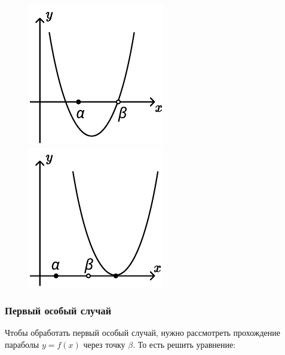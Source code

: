 \begin {figure}[h]
    \begin {minipage} [t] {0.5\linewidth}
        \centering
        \includegraphics [width=0.6\linewidth] {images/image_06.pdf}
    \end {minipage}
    \begin {minipage} [t] {0.5\linewidth}
        \centering
        \includegraphics [width=0.6\linewidth] {images/image_18.pdf}
    \end {minipage}
\end {figure}

\subsubsection {Первый особый случай}

Чтобы обработать первый особый случай, нужно рассмотреть прохождение параболы $y = f(x)$ через
точку $\beta$. То есть решить уравнение:

